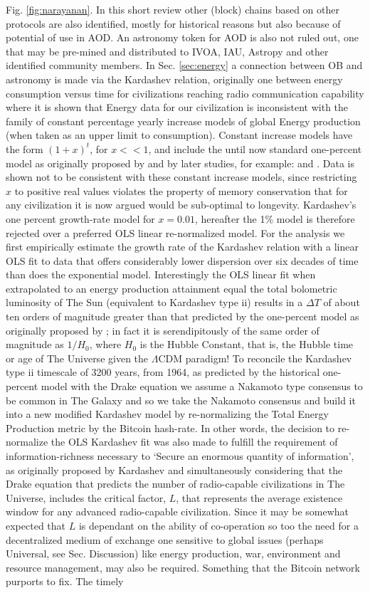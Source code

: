 \documentclass[final,5p,times,twocolumn,authoryear]{elsarticle}
\begin{document}
Fig. \ref{fig:narayanan}. In this short review other (block) chains based on other protocols are also identified, mostly for historical reasons but also because of potential of use in AOD. An astronomy token for AOD is also not ruled out, one that may be pre-mined and distributed to IVOA, IAU, Astropy and other identified community members. In Sec. \ref{sec:energy} a connection between OB and astronomy is made via the Kardashev relation, originally one between energy consumption versus time for civilizations reaching radio communication capability where it is shown that Energy data for our civilization is inconsistent with the family of constant percentage yearly increase models of global Energy production (when taken as an upper limit to consumption). Constant increase models have the form $(1+x)^{t}$, for $x<< 1$, and include the until now standard one-percent model as originally proposed by \cite{kar64} and by later studies, for example:  \citet{sagan73} and \cite{gray2020}. Data is shown not to be consistent with these constant increase models, since restricting $x$ to positive real values violates the property of memory conservation that for any civilization it is now argued would be sub-optimal to longevity. Kardashev's one percent growth-rate model for $x=0.01$, hereafter the 1\% model is therefore rejected over a preferred OLS linear re-normalized model. For the analysis we first empirically estimate the growth rate of the Kardashev relation with a linear OLS fit to data that offers considerably lower dispersion over six decades of time than does the exponential model. Interestingly the OLS linear fit when extrapolated to an energy production attainment equal the total bolometric luminosity of The Sun (equivalent to Kardashev type ii) results in a $\Delta T$ of about ten orders of magnitude greater than that predicted by the one-percent model as originally proposed by \cite{kar64}; in fact it is serendipitously of the same order of magnitude as $1/H{_0}$, where $H_{0}$ is the Hubble Constant, that is, the Hubble time or age of The Universe given the $\Lambda$CDM paradigm! To reconcile the Kardashev type ii timescale of 3200 years, from 1964, as predicted by the historical one-percent model with the Drake equation we assume a Nakamoto type consensus to be common in The Galaxy and so we take the Nakamoto consensus and build it into a new modified Kardashev model by re-normalizing the Total Energy Production metric by the Bitcoin hash-rate. In other words, the decision to re-normalize the OLS Kardashev fit was also made to fulfill the requirement of information-richness necessary to `Secure an enormous quantity of information', as originally proposed by Kardashev and simultaneously considering that the Drake equation that predicts the number of radio-capable civilizations in The Universe, includes the critical factor, $L$, that represents the average existence window for any advanced radio-capable civilization. Since it may be somewhat expected that $L$ is dependant on the ability of co-operation so too the need for a decentralized medium of exchange one sensitive to global issues (perhaps Universal, see Sec. Discussion) like energy production, war, environment and resource management, may also be required. Something that the Bitcoin network purports to fix. The timely 
\end{document}
